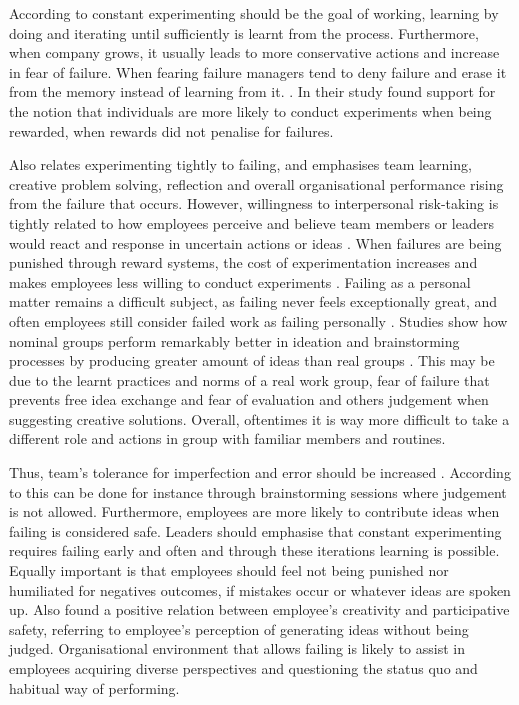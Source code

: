 According to \citet{amabile2008creativity} constant experimenting should be the goal of working, learning by doing and iterating until sufficiently is learnt from the process. Furthermore, when company grows, it usually leads to more conservative actions and increase in fear of failure. When fearing failure managers tend to deny failure and erase it from the memory instead of learning from it. \citep{amabile2008creativity}. In their study \citet{lee2004mixed} found support for the notion that individuals are more likely to conduct experiments when being rewarded, when rewards did not penalise for failures. 

Also \citet{edmondson1999psychological} relates experimenting tightly to failing, and emphasises team learning, creative problem solving, reflection and overall organisational performance rising from the failure that occurs. However, willingness to interpersonal risk-taking is tightly related to how employees perceive and believe team members or leaders would react and response in uncertain actions or ideas \citep{farson2002failuretolerantleader}. When failures are being punished through reward systems, the cost of experimentation increases and makes employees less willing to conduct experiments \citep{thomke2001enlightened}. Failing as a personal matter remains a difficult subject, as failing never feels exceptionally great, and often employees still consider failed work as failing personally \citep{farson2002failuretolerantleader}. Studies show how nominal groups perform remarkably better in ideation and brainstorming processes by producing greater amount of ideas than real groups \citep{jung2001transformational,sosik1998transformational}. This may be due to the learnt practices and norms of a real work group, fear of failure that prevents free idea exchange and fear of evaluation and others judgement when suggesting creative solutions. Overall, oftentimes it is way more difficult to take a different role and actions in group with familiar members and routines. \citep{jung2001transformational}

Thus, team's tolerance for imperfection and error should be increased \citep{edmondson1999psychological}. According to \citet{thomke2001enlightened} this can be done for instance through brainstorming sessions where judgement is not allowed. Furthermore, employees are more likely to contribute ideas when failing is considered safe. Leaders should emphasise that constant experimenting requires failing early and often and through these iterations learning is possible. Equally important is that employees should feel not being punished nor humiliated for negatives outcomes, if mistakes occur or whatever ideas are spoken up. \citep{amabile2008creativity, amabile1996assessing} Also \citet{de2001minority} found a positive relation between employee's creativity and participative safety, referring to employee's perception of generating ideas without being judged. Organisational environment that allows failing is likely to assist in employees acquiring diverse perspectives and questioning the status quo and habitual way of performing. \citep{amabile1996assessing}

